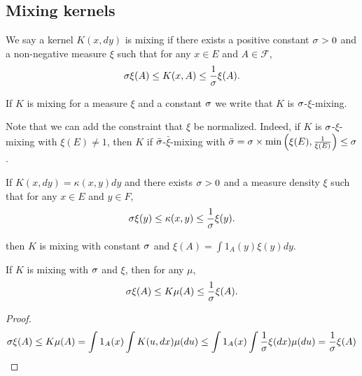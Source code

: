 \subsection{Mixing kernels}
\begin{definition}
    We say a kernel $K(x, dy)$ is mixing if there exists a positive constant $\sigma > 0$ and a non-negative measure $\xi$ such that for any $x\in E$ and $A\in\mathcal F$,
    \begin{equation}
        \sigma\xi(A) \leq K(x, A) \leq \frac{1}{\sigma}\xi(A).
    \end{equation}
\end{definition}
If $K$ is mixing for a measure $\xi$ and a constant $\sigma$ we write that $K$ is $\sigma$-$\xi$-mixing.

\begin{remark}
    Note that we can add the constraint that $\xi$ be normalized. Indeed, if $K$ is $\sigma$-$\xi$-mixing with $\xi(E)\neq 1$, then $K$ if $\bar {\sigma}$-$\bar\xi$-mixing with $\bar{\sigma} = \sigma \times \min\left(\xi(E), \frac{1}{\xi(E)}\right)\leq \sigma$.
\end{remark}

\begin{proposition}
    If $K(x, dy) = \kappa(x, y)dy$ and there exists $\sigma >0$ and a measure density $\xi$ such that for any $x\in E$ and $y\in F$,
    \begin{equation}
        \sigma\xi(y) \leq \kappa(x, y) \leq \frac{1}{\sigma}\xi(y).
    \end{equation}

    then $K$ is mixing with constant $\sigma$ and $\xi(A)=\int 1_A(y)\xi(y)dy$.
\end{proposition}

\begin{proposition}
    If $K$ is mixing with $\sigma$ and $\xi$, then for any $\mu$,
    \begin{equation}
        \sigma\xi(A)\leq K\mu(A)\leq \frac{1}{\sigma}\xi(A).
    \end{equation}
\end{proposition}
\begin{proof}
    \begin{equation}
    \sigma\xi(A)\leq K\mu(A)=\int 1_A(x)\int K(u, dx)\mu(du) \leq \int 1_A(x)\int \frac{1}{\sigma}\xi(dx)\mu(du)=\frac{1}{\sigma}\xi(A)
    \end{equation}
\end{proof}


